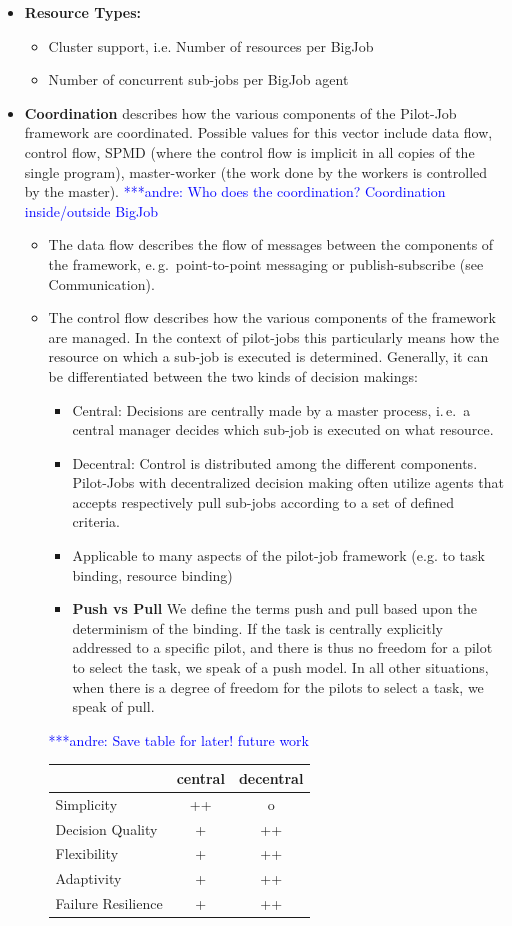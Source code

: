 \documentclass[]{article}
\newcommand{\alnote}[1]{ {\textcolor{blue} { ***andre: #1 }}}
\newcommand{\alnote}[1]{}
\begin{document}
\begin{itemize}
	\item \textbf{Resource Types:}
	\begin{itemize}
		\item Cluster support, i.e. Number of resources per BigJob
		\item Number of concurrent sub-jobs per BigJob agent
	\end{itemize}
	\item \textbf{Coordination} describes how the various components of 
	the Pilot-Job framework are	coordinated. Possible values for this vector include data
	flow, control flow, SPMD (where the control flow is implicit in all copies of the single program), master-worker
	(the work done by the workers is controlled by the master). \alnote{Who does the coordination? Coordination inside/outside BigJob}
	\begin{itemize}
		\item The data flow describes the flow of messages between the components of the framework, e.\,g.\ point-to-point messaging or publish-subscribe (see Communication).
		\item The control flow describes how the various components of the
		 framework are managed. In the context of pilot-jobs this particularly means how the resource on which a sub-job is executed is determined. Generally, it can be differentiated between the two kinds of decision makings:
			\begin{itemize}
				\item Central: Decisions are centrally made by a master
				 process, i.\,e.\ a central manager decides which sub-job is
				 executed on what resource.
				\item Decentral: Control is distributed among the 
				different components. Pilot-Jobs with decentralized decision 
				making often utilize agents that accepts respectively pull 
				sub-jobs according to a set of defined criteria.
				\item Applicable to many aspects of the pilot-job framework (e.g. to task binding, resource binding)
				\item \textbf{Push vs Pull} We define the terms push and pull 
				based upon the determinism of the binding. If the task is 
				centrally explicitly addressed to a specific pilot, and there is 
				thus no freedom for a pilot to select the task, we speak of a 
				push model. In all other situations, when there is a 
            	degree of freedom for the pilots to select a task, we speak of 
            	pull.
			\end{itemize}
			\alnote{Save table for later! future work}
			\begin{tabular}{|l|c|c|}
				\hline
				&central &decentral\\
				\hline
			Simplicity  &++			&o \\ \hline
			Decision Quality &+ 	&++ \\ \hline
			Flexibility &+			&++ \\ \hline
			Adaptivity  &+ 			&++ \\ \hline
			Failure Resilience &+   &++\\ \hline
			

\end{tabular}
\end{itemize}
\end{itemize}
\end{document}
